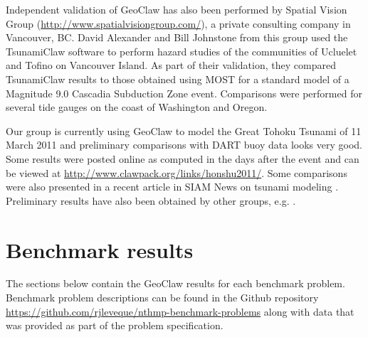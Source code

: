 Independent validation of GeoClaw has also been performed by Spatial Vision
Group (\url{http://www.spatialvisiongroup.com/}), a private consulting
company in Vancouver, BC. David Alexander and Bill Johnstone from this group
used the  TsunamiClaw software to perform hazard
studies of the communities of Ucluelet and Tofino on Vancouver Island.  As
part of their validation, they compared  TsunamiClaw results to those obtained
using MOST for a standard model of a Magnitude 9.0 
Cascadia Subduction Zone event.  Comparisons were performed for several tide
gauges on the coast of Washington and Oregon.

Our group is currently using GeoClaw to model the Great Tohoku Tsunami of 11
March 2011 and preliminary comparisons with DART buoy data looks very good.
Some results were posted online as computed in the days after the event and
can be viewed at
\url{http://www.clawpack.org/links/honshu2011/}.
Some comparisons were also presented in a recent article in SIAM News on tsunami
modeling \cite{siamnews-tsunami}.  Preliminary results have also been
obtained by other groups, e.g. \cite{ZhangYuenEtal:2011}.


\section{Benchmark results}

The sections below contain the GeoClaw results for each benchmark problem.
Benchmark problem descriptions can be found in the Github repository
\url{https://github.com/rjleveque/nthmp-benchmark-problems}
\cite{bp-description} 
along with data that was provided as part of the problem specification.

